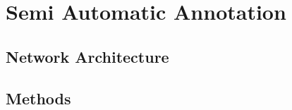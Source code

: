 \chapter{Semi Automatic Annotation} \label{chapter:semi_automatic}

\section{Network Architecture}

\section{Methods}